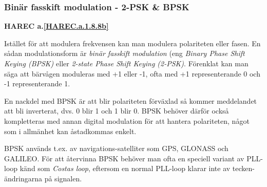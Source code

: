 \subsubsection{Binär fasskift modulation - 2-PSK \& BPSK}
\textbf{HAREC a.\ref{HAREC.a.1.8.8b}\label{myHAREC.a.1.8.8b}}
\begin{rev-nytt}[MAD]

Istället för att modulera frekvensen kan man modulera polariteten eller fasen.
En sådan modulationsform är \emph{binär fasskift modulation} (eng
\emph{Binary Phase Shift Keying (BPSK)} eller \emph{2-state Phase Shift Keying
(2-PSK)}. Förenklat kan man säga att bärvågen moduleras med +1 eller -1,
ofta med +1 representerande 0 och -1 representerande 1.

En nackdel med BPSK är att blir polariteten förväxlad så kommer meddelandet
att bli inverterat, dvs. 0 blir 1 och 1 blir 0. BPSK behöver därför också
kompletteras med annan digital modulation för att hantera polariteten, något
som i allmänhet kan åstadkommas enkelt.

BPSK används t.ex. av navigations-satelliter som GPS, GLONASS och GALILEO.
För att återvinna BPSK behöver man ofta en speciell variant av PLL-loop känd
som \emph{Costas loop}, eftersom en normal PLL-loop klarar inte av tecken-
ändringarna på signalen.

\end{rev-nytt}


